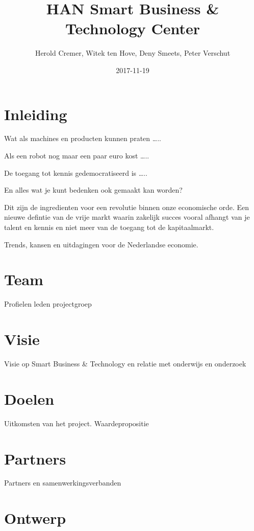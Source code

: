 \documentclass[]{book}
\title{HAN Smart Business \& Technology Center}
\author{Herold Cremer, Witek ten Hove, Deny Smeets, Peter Verschut}
\date{2017-11-19}
\begin{document}
\maketitle

{
\setcounter{tocdepth}{1}
\tableofcontents
}
\chapter{Inleiding}\label{inleiding}

Wat als machines en producten kunnen praten \ldots{}..

Als een robot nog maar een paar euro kost \ldots{}..

De toegang tot kennis gedemocratiseerd is \ldots{}..

En alles wat je kunt bedenken ook gemaakt kan worden?

Dit zijn de ingredienten voor een revolutie binnen onze economische
orde. Een nieuwe defintie van de vrije markt waarin zakelijk succes
vooral afhangt van je talent en kennis en niet meer van de toegang tot
de kapitaalmarkt.

Trends, kansen en uitdagingen voor de Nederlandse economie.

\chapter{Team}\label{team}

Profielen leden projectgroep

\chapter{Visie}\label{visie}

Visie op Smart Business \& Technology en relatie met onderwijs en
onderzoek

\chapter{Doelen}\label{doelen}

Uitkomsten van het project. Waardepropositie

\chapter{Partners}\label{partners}

Partners en samenwerkingsverbanden

\chapter{Ontwerp}\label{ontwerp}
\end{document}

